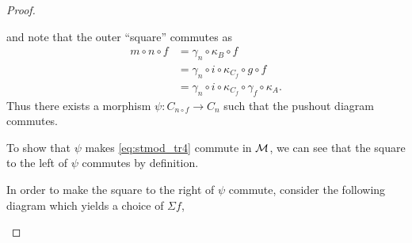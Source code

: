 \begin{proof}
\begin{enumerate}[label={(\bfseries TR\arabic*)}]
{\begin{center}
            \end{center}
            and note that the outer ``square'' commutes as
            \begin{equation}
                \label{eq:stmod_tr4_m_n_f_equal_something_else}
                \begin{aligned}
                    m \circ n \circ f &= \gamma_n \circ \kappa_B \circ f \\
                    &= \gamma_n \circ i \circ \kappa_{C_f} \circ g \circ f \\
                    &= \gamma_n \circ i \circ \kappa_{C_f} \circ \gamma_f \circ \kappa_A.
                \end{aligned}
            \end{equation}
            Thus there exists a morphism \( \psi: C_{n \circ f} \to C_n \) such that the pushout diagram commutes.

            To show that \( \psi \) makes \autoref{eq:stmod_tr4} commute in \( {\mathcal{M}} \), we can see that the square to the left of \( \psi \) commutes by definition.

            In order to make the square to the right of \( \psi \) commute, consider the following diagram which yields a choice of \( \Sigma f \),
            \begin{center}
\end{center}}
\end{enumerate}
\end{proof}
